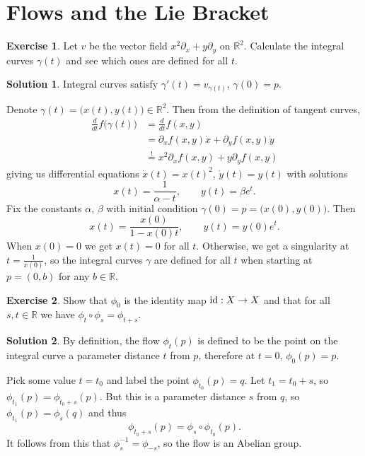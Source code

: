 \documentclass[11pt, a4paper]{report}
\theoremstyle{definition}
\newtheorem{exercise}{Exercise}[part]
\newtheorem{solution}{Solution}[part]
\newenvironment{ex}{\begin{exercise}}{\end{exercise}\pagebreak[1]}
\newenvironment{sol}{\begin{solution}}{\end{solution}\pagebreak[3]}
\newcommand*{\op}[1]{\ensuremath\mathop{}\mathopen{}#1}
\newcommand*{\id}{\op{\mathrm{id}}}
\begin{document}
\section{Flows and the Lie Bracket}\label{sec:flowsandtheliebracket}

\begin{ex}

Let $v$ be the vector field $x^2 \partial_x + y \partial_y$ on $\mathbb{R}^2$. Calculate the integral curves $\gamma(t)$ and see which ones are defined for all $t$.

\end{ex}

\begin{sol}

Integral curves satisfy $\gamma'(t) = v_{\gamma(t)}$, $\gamma(0) = p$.

Denote $\gamma(t) = \bigl(x(t), y(t) \bigr) \in \mathbb{R}^2$. Then from the definition of tangent curves,
\begin{align*}
    \frac{d}{dt} f \bigl(\gamma(t) \bigr) &= \frac{d}{dt} f(x, y) \\
        &= \partial_x f(x, y) \dot{x} + \partial_y f(x, y) \dot{y} \\
        &\overset{!}{=} x^2 \partial_x f(x, y) + y \partial_y f(x, y)
\end{align*}
giving us differential equations $\dot{x}(t) = {x(t)}^2$, $\dot{y}(t) = y(t)$ with solutions
\[
    x(t) = \frac{1}{\alpha - t}, \qquad
    y(t) = \beta e^t.
\]
Fix the constants $\alpha$, $\beta$ with initial condition $\gamma(0) = p = \bigl( x(0), y(0) \bigr)$. Then
\[
    x(t) = \frac{x(0)}{1 - x(0)t}, \qquad
    y(t) = y(0) e^t.
\]
When $x(0) = 0$ we get $x(t) = 0$ for all $t$. Otherwise, we get a singularity at $t = \frac{1}{x(0)}$, so the integral curves $\gamma$ are defined for all $t$ when starting at $p = (0, b)$ for any $b \in \mathbb{R}$.

\end{sol}

\begin{ex}

Show that $\phi_0$ is the identity map $\id: X \to X$ and that for all $s, t \in \mathbb{R}$ we have $\phi_t \circ \phi_s = \phi_{t + s}$.

\end{ex}

\begin{sol}

By definition, the flow $\phi_t(p)$ is defined to be the point on the integral curve a parameter distance $t$ from $p$, therefore at $t = 0$, $\phi_0(p) = p$.

Pick some value $t = t_0$ and label the point $\phi_{t_0}(p) = q$. Let $t_1 = t_0 + s$, so $\phi_{t_1}(p) = \phi_{t_0 + s}(p)$. But this is a parameter distance $s$ from $q$, so $\phi_{t_1}(p) = \phi_s(q)$ and thus
\[
    \phi_{t_0 + s}(p) = \phi_s \circ \phi_{t_0}(p).
\]
It follows from this that $\phi_s^{-1} = \phi_{-s}$, so the flow is an Abelian group.

\end{sol}
\end{document}
